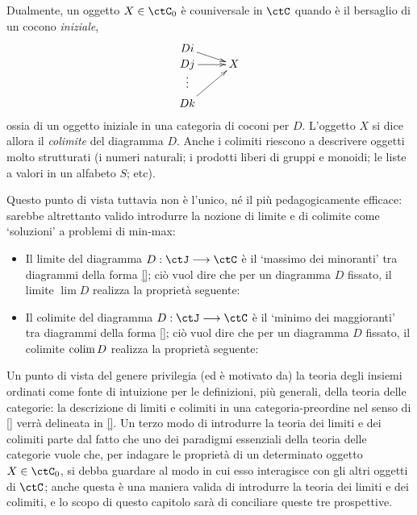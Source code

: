 Dualmente, un oggetto \(X\in\ctC_0\) è couniversale in \(\ctC\) quando è il bersaglio di un cocono \emph{iniziale},
\[\xymatrix@R=0mm{
	Di \ar@{->}[rd] &  \\
	Dj \ar@{->}[r] & X \\
	\vdots &  \\
	Dk \ar@{->}[ruu] &
	}\]
ossia di un oggetto iniziale in una categoria di coconi per \(D\). L'oggetto \(X\) si dice allora il \emph{colimite} del diagramma \(D\). Anche i colimiti riescono a descrivere oggetti molto strutturati (i numeri naturali; i prodotti liberi di gruppi e monoidi; le liste a valori in un alfabeto \(S\); etc).

Questo punto di vista tuttavia non è l'unico, né il più pedagogicamente efficace: sarebbe altrettanto valido introdurre la nozione di limite e di colimite come `soluzioni' a problemi di min-max:
\begin{itemize}
	\item Il limite del diagramma \(D : \ctJ\fun\ctC\) è il `massimo dei minoranti' tra diagrammi della forma \eqref{}; ciò vuol dire che per un diagramma \(D\) fissato, il limite \(\lim D\) realizza la proprietà seguente:
	      \Todo{}
	\item Il colimite del diagramma \(D : \ctJ\fun\ctC\) è il `minimo dei maggioranti' tra diagrammi della forma \eqref{}; ciò vuol dire che per un diagramma \(D\) fissato, il colimite \(\operatorname*{colim} D\) realizza la proprietà seguente:
	      \Todo{}
\end{itemize}
Un punto di vista del genere privilegia (ed è motivato da) la teoria degli insiemi ordinati come fonte di intuizione per le definizioni, più generali, della teoria delle categorie: la descrizione di limiti e colimiti in una categoria-preordine nel senso di \ref{} verrà delineata in \ref{}.
\Todo{}
Un terzo modo di introdurre la teoria dei limiti e dei colimiti parte dal fatto che uno dei paradigmi essenziali della teoria delle categorie vuole che, per indagare le proprietà di un determinato oggetto $X\in\ctC_0$, si debba guardare al modo in cui esso interagisce con gli altri oggetti di $\ctC$; anche questa è una maniera valida di introdurre la teoria dei limiti e dei colimiti, e lo scopo di questo capitolo sarà di conciliare queste tre prospettive. 

